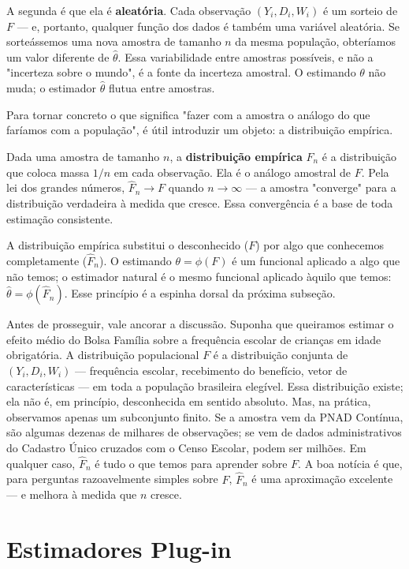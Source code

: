 A segunda é que ela é \textbf{aleatória}. Cada observação $(Y_i, D_i, W_i)$ é um sorteio de $F$ --- e, portanto, qualquer função dos dados é também uma variável aleatória. Se sorteássemos uma nova amostra de tamanho $n$ da mesma população, obteríamos um valor diferente de $\hat{\theta}$. Essa variabilidade entre amostras possíveis, e não a "incerteza sobre o mundo", é a fonte da incerteza amostral. O estimando $\theta$ não muda; o estimador $\hat{\theta}$ flutua entre amostras.

Para tornar concreto o que significa "fazer com a amostra o análogo do que faríamos com a população", é útil introduzir um objeto: a distribuição empírica.

Dada uma amostra de tamanho $n$, a \textbf{distribuição empírica} $\hat{F}_n$ é a distribuição que coloca massa $1/n$ em cada observação. Ela é o análogo amostral de $F$. Pela lei dos grandes números, $\hat{F}_n \to F$ quando $n \to \infty$ --- a amostra "converge" para a distribuição verdadeira à medida que cresce. Essa convergência é a base de toda estimação consistente.

A distribuição empírica substitui o desconhecido ($F$) por algo que conhecemos completamente ($\hat{F}_n$). O estimando $\theta = \phi(F)$ é um funcional aplicado a algo que não temos; o estimador natural é o mesmo funcional aplicado àquilo que temos: $\hat{\theta} = \phi(\hat{F}_n)$. Esse princípio é a espinha dorsal da próxima subseção.

Antes de prosseguir, vale ancorar a discussão. Suponha que queiramos estimar o efeito médio do Bolsa Família sobre a frequência escolar de crianças em idade obrigatória. A distribuição populacional $F$ é a distribuição conjunta de $(Y_i, D_i, W_i)$ --- frequência escolar, recebimento do benefício, vetor de características --- em toda a população brasileira elegível. Essa distribuição existe; ela não é, em princípio, desconhecida em sentido absoluto. Mas, na prática, observamos apenas um subconjunto finito. Se a amostra vem da PNAD Contínua, são algumas dezenas de milhares de observações; se vem de dados administrativos do Cadastro Único cruzados com o Censo Escolar, podem ser milhões. Em qualquer caso, $\hat{F}_n$ é tudo o que temos para aprender sobre $F$. A boa notícia é que, para perguntas razoavelmente simples sobre $F$, $\hat{F}_n$ é uma aproximação excelente --- e melhora à medida que $n$ cresce.

\section{Estimadores Plug-in}
\label{subsec:plug-in}

